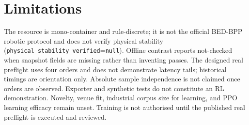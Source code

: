 \section{Limitations}

The resource is mono-container and rule-discrete; it is not the official
BED-BPP robotic protocol and does not verify physical stability
(\texttt{physical\_stability\_verified}=\texttt{null}). Offline contrast
reports not-checked when snapshot fields are missing rather than inventing
passes. The designed real preflight uses four orders and does not demonstrate
latency tails; historical timings are orientation only. Absolute sample
independence is not claimed once orders are observed. Exporter and synthetic
tests do not constitute an RL demonstration. Novelty, venue fit, industrial
corpus size for learning, and PPO learning efficacy remain unset. Training is
not authorised until the published real preflight is executed and reviewed.

